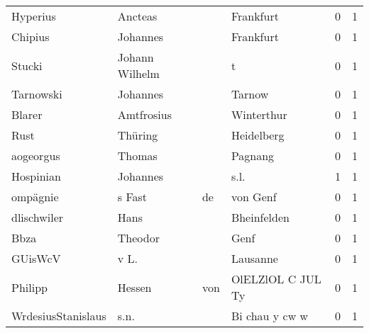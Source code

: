 \begin{center}
\begin{tiny}
\begin{longtabu}{llllrr}
                 Hyperius &                            Ancteas &             &                                   Frankfurt &          0 &         1 \\
                  Chipius &                           Johannes &             &                                   Frankfurt &          0 &         1 \\
                   Stucki &                     Johann Wilhelm &             &                                           t &          0 &         1 \\
                Tarnowski &                           Johannes &             &                                      Tarnow &          0 &         1 \\
                   Blarer &                         Amtfrosius &             &                                  Winterthur &          0 &         1 \\
                     Rust &                            Thüring &             &                                  Heidelberg &          0 &         1 \\
                aogeorgus &                             Thomas &             &                                     Pagnang &          0 &         1 \\
                Hospinian &                           Johannes &             &                                        s.l. &          1 &         1 \\
                 ompägnie &                             s Fast &          de &                                    von Genf &          0 &         1 \\
              dlischwiler &                               Hans &             &                                 Bheinfelden &          0 &         1 \\
                     Bbza &                            Theodor &             &                                        Genf &          0 &         1 \\
                  GUisWcV &                               v L. &             &                                    Lausanne &          0 &         1 \\
                  Philipp &                             Hessen &         von &                           OlELZlOL C JUL Ty &          0 &         1 \\
       WrdesiusStanislaus &                               s.n. &             &                              Bi chau y cw w &          0 &         1 \\

\end{longtabu}
\end{tiny}
\end{center}
